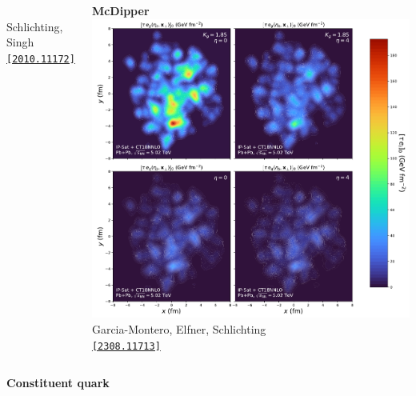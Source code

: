 \documentclass[aspectratio=169,11pt,usenames,dvipsnames]{beamer}
\begin{document}
\begin{frame}
\begin{columns}[onlytextwidth,c]
\begin{center}
                    \\[-4pt]
                    {\tiny Schlichting, Singh} \\ \tiny \href{https://arxiv.org/abs/2010.11172}{\color{jyured}\texttt{[2010.11172]}\scalebox{.6}{$^\text{\tiny\faExternalLink}$}}
                \end{center}
                \begin{center}
                    {\scriptsize\bfseries McDipper}
                    \\[1pt]
                    \includegraphics[width=0.65\columnwidth]{images/Event_IPSat_PbPb_5020_energies_crop.pdf}
                    \\[-4pt]
                    {\tiny Garcia-Montero, Elfner, Schlichting} \\ \tiny \href{https://arxiv.org/abs/2308.11713}{\color{jyured}\texttt{[2308.11713]}\scalebox{.6}{$^\text{\tiny\faExternalLink}$}}
                \end{center}
        \end{columns}    
        \vspace{-10pt} 
        \begin{columns}[onlytextwidth,c]
                \begin{center}
                    {\scriptsize\bfseries Constituent quark}
                    \\[1pt]

\end{center}
\end{columns}
\end{frame}
\end{document}
